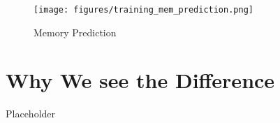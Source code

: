 \documentclass{article}
\begin{document}
    \begin{figure}[!ht]
      \centering
      \texttt{[image: figures/training\_mem\_prediction.png]}
      \caption{Memory Prediction}
      \label{fig:mem-prediction}
    \end{figure}




  \section{Why We see the Difference}


    Placeholder

    \clearpage



\end{document}
